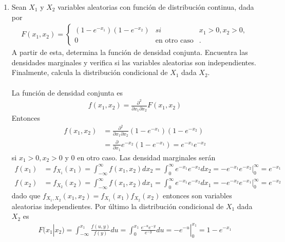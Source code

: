 \documentclass{article}
\begin{document}
\begin{enumerate}
\item Sean $X_1$ y $X_2$ variables aleatorias con funci\'on de distribuci\'on continua, dada por
\begin{align*}
F(x_1, x_2) = \left\{
\begin{array}{lcc}
(1 - e^{-x_1})(1-e^{-x_2}) & si & x_1 >0, x_2 > 0, \\
0 & \text{en otro caso} & .
\end{array}
\right.
\end{align*}
A partir de esta, determina la funci\'on de densidad conjunta. Encuentra las densidades marginales y verifica si las variables aleatorias son independientes. Finalmente, calcula la distribuci\'on condicional de $X_1$ dada $X_2$.
\\ \\
La funci\'on de densidad conjunta es
\begin{align*}
f(x_1, x_2) = \frac{\partial ^2}{\partial x_1 \partial x_2} F(x_1, x_2)
\end{align*}
Entonces
\begin{align*}
f(x_1, x_2) &= \frac{\partial ^2}{\partial x_1 \partial x_2}(1 - e^{-x_1})(1-e^{-x_2}) \\
&= \frac{\partial}{\partial x_1}e^{-x_2}(1-e^{-x_1}) = e^{-x_1}e^{-x_2}
\end{align*}
si $x_1 >0, x_2 > 0$ y $0$ en otro caso. Las densidad marginales ser\'an
\begin{align*}
f(x_1) &= f_{X_1}(x_1) = \int_{-\infty}^{\infty}f(x_1,x_2)dx_2 = \int_0^{\infty} e^{-x_1}e^{-x_2} dx_2 = -e^{-x_1}e^{-x_2}|_0^{\infty} = e^{-x_1} \\
f(x_2) &= f_{X_2}(x_2) = \int_{-\infty}^{\infty}f(x_1,x_2)dx_1 = \int_0^{\infty} e^{-x_1}e^{-x_2} dx_1 = -e^{-x_2}e^{-x_1}|_0^{\infty} = e^{-x_2}
\end{align*}
dado que $f_{X_1, X_2}(x_1,x_2) = f_{X_1}(x_1)f_{X_2}(x_2)$ entonces son variables aleatorias independientes. Por \'ultimo la distribuci\'on condicional de $X_1$ dada $X_2$ es
\begin{align*}
F(x_1|x_2) = \int_{-\infty}^{x_1} \frac{f(u,y)}{f(y)}du = \int_0^{x_1}\frac{e^{-u}e^{-y}}{e^{-y}} du = -e^{-u}|_0 ^{x_1} =1 -e^{-x_1}
\end{align*}
\end{enumerate}
\end{document}
